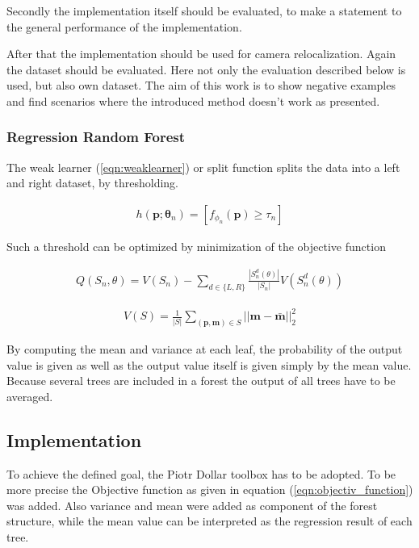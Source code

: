 Secondly the implementation itself should be evaluated, to make a statement to the general performance of the implementation.

After that the implementation should be used for camera relocalization. Again the dataset should be evaluated. Here not only the evaluation described below is used, but also own dataset. The aim of this work is to show negative examples and find scenarios where the introduced method \cite{shotton} doesn't work as presented.

\subsubsection{Regression Random Forest}
\label{rrf_intro}
The weak learner (\ref{eqn:weaklearner}) or split function splits the data into a left and right dataset, by thresholding.

\begin{eqnarray}\label{eqn:weaklearner}
  h(\mathbf{p};\mathbf{\theta}_n) = [ f_{\phi_n}(\mathbf{p}) \geq \tau_n ]
\end{eqnarray}

Such a threshold can be optimized by minimization of the objective function

\begin{eqnarray} \label{eqn:objectiv_function}
  Q(S_n,\theta) = V(S_n) - \sum_{d\in\{L,R\}}{\frac{|S_n^d(\theta)|}{|S_n|}V(S_n^d(\theta))}
\end{eqnarray}

\begin{eqnarray}
  V(S) = \frac{1}{|S|} \sum_{(\mathbf{p},\mathbf{m}) \in S}{||\mathbf{m} - \mathbf{\bar m}||_2^2}
\end{eqnarray}

By computing the mean and variance at each leaf, the probability of the output value is given as well as the output value itself is given simply by the mean value.
Because several trees are included in a forest the output of all trees have to be averaged.

\subsection{Implementation} %
\label{sub:implementation}
To achieve the defined goal, the Piotr Dollar toolbox \cite{piotr} has to be adopted. To be more precise the Objective function as given in equation (\ref{eqn:objectiv_function}) was added. Also variance and mean were added as component of the forest structure, while the mean value can be interpreted as the regression result of each tree.

